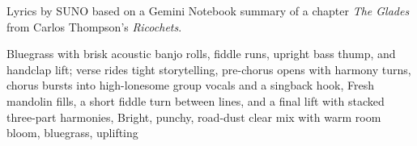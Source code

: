 
\begin{notes}
Lyrics by SUNO based on a Gemini Notebook summary of a chapter \emph{The Glades} from Carlos Thompson's \emph{Ricochets}.
\end{notes}
\begin{style}
Bluegrass with brisk acoustic banjo rolls, fiddle runs, upright bass thump, and handclap lift; verse rides tight storytelling, pre-chorus opens with harmony turns, chorus bursts into high-lonesome group vocals and a singback hook, Fresh mandolin fills, a short fiddle turn between lines, and a final lift with stacked three-part harmonies, Bright, punchy, road-dust clear mix with warm room bloom, bluegrass, uplifting
\end{style}
